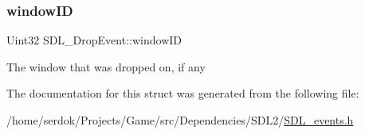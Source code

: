\subsubsection{\texorpdfstring{window\+ID}{windowID}}
{\footnotesize\ttfamily Uint32 S\+D\+L\+\_\+\+Drop\+Event\+::window\+ID}

The window that was dropped on, if any 

The documentation for this struct was generated from the following file\+:\begin{DoxyCompactItemize}
\item 
/home/serdok/\+Projects/\+Game/src/\+Dependencies/\+S\+D\+L2/\hyperlink{SDL__events_8h}{S\+D\+L\+\_\+events.\+h}\end{DoxyCompactItemize}
